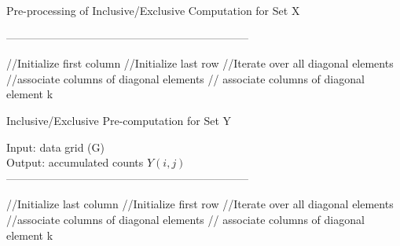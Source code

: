 \documentclass[AMA,LATO1COL]{WileyNJD-v2}
\begin{document}
\begin{algorithm}[t!]
\label{pre2}
\caption{Pre-processing of Inclusive/Exclusive Computation for Set X}\label{pre2}
------------------------------------------------------------------ \\
\begin{algorithmic}[1]
\State //Initialize first column
\EndFor
\State //Initialize last row
\EndFor
\State //Iterate over all diagonal elements
\State //associate columns of diagonal elements
\EndFor
\State // associate columns of diagonal element k
\EndFor
\EndFor
\end{algorithmic}
\end{algorithm}

\begin{algorithm}[t!]
\label{pre1}
\caption{Inclusive/Exclusive Pre-computation for Set Y}\label{pre1}
Input: data grid (G) \\
Output: accumulated counts $Y(i,j)$\\
------------------------------------------------------------------ \\
\begin{algorithmic}[1]
\State //Initialize last column
\EndFor
\State //Initialize first row
\EndFor
\State //Iterate over all diagonal elements
\State //associate columns of diagonal elements
\EndFor
\State // associate columns of diagonal element k
\EndFor
\EndFor
\end{algorithmic}
\end{algorithm}


\clearpage
\end{document}
